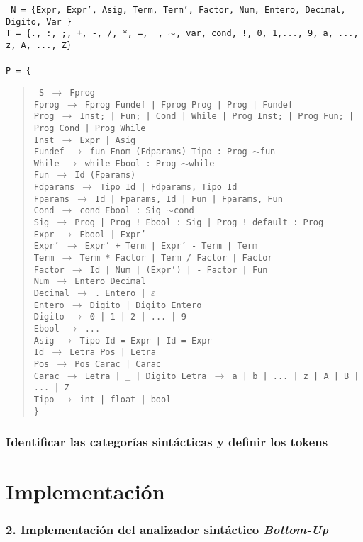 \documentclass[12pt]{article}
\begin{document}
\noindent
\noindent
\texttt{
  \noindent
N = \{Expr, Expr', Asig, Term, Term', Factor, Num, Entero, Decimal, Digito, Var \}\\
T = \{., :, ;, +, -, /, *, =, \_, $\sim$, var, cond, !, 0, 1,..., 9, a, ..., z, A, ..., Z\}\\ \\ 
P = \{}
\begin{quote}
  \texttt{
    S $\to$ Fprog\\
    Fprog $\to$ Fprog Fundef | Fprog Prog | Prog | Fundef\\
    Prog $\to$ Inst; | Fun; | Cond | While | Prog Inst; | Prog Fun; | Prog Cond | Prog While\\
    Inst $\to$ Expr | Asig\\
    Fundef $\to$ fun Fnom (Fdparams) Tipo : Prog $\sim$fun\\
    While $\to$ while Ebool : Prog $\sim$while\\    
    Fun $\to$ Id (Fparams)\\
    Fdparams $\to$ Tipo Id | Fdparams, Tipo Id\\
    Fparams $\to$ Id | Fparams, Id | Fun | Fparams, Fun\\
    Cond $\to$ cond Ebool : Sig $\sim$cond \\
    Sig $\to$ Prog | Prog ! Ebool : Sig | Prog ! default : Prog \\    
    Expr $\to$ Ebool | Expr'  \\
    Expr' $\to$ Expr' + Term | Expr' - Term | Term \\
    Term $\to$ Term * Factor | Term / Factor | Factor \\
    Factor $\to$ Id | Num | (Expr') | - Factor | Fun \\
    Num $\to$ Entero Decimal \\
    Decimal $\to$ . Entero | $\varepsilon$ \\
    Entero $\to$ Digito | Digito Entero \\
    Digito $\to$ 0 | 1 | 2 | ... | 9 \\
    Ebool $\to$ ... \\
    Asig $\to$ Tipo Id = Expr | Id = Expr \\
    Id  $\to$ Letra Pos | Letra \\
    Pos  $\to$ Pos Carac | Carac \\
    Carac $\to$ Letra | \_ | Digito
    Letra $\to$ a | b | ... | z | A | B | ... | Z \\
    Tipo $\to$ int | float | bool \\
    \}
}
 
\end{quote}

\subsubsection*{Identificar las categorías sintácticas y definir los tokens}

\section{Implementación}
\subsubsection*{2. Implementación del analizador sintáctico \textit{Bottom-Up}}
\end{document}
